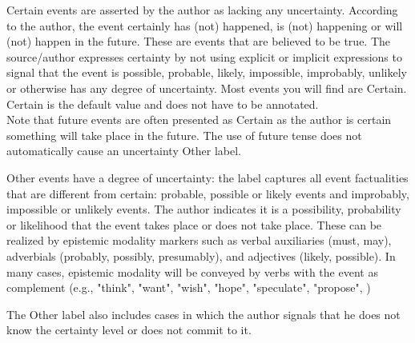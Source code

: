 \begin{description}[noitemsep,leftmargin=!,labelwidth=\widthof{\bfseries Certain}]
    \item[Certain] Certain events are asserted by the author as lacking any uncertainty.
    According to the author, the event certainly has (not) happened, is (not) happening or will (not) happen in the future.
    These are events that are believed to be true.
    The source/author expresses certainty by not using explicit or implicit expressions to signal that the event is possible, probable, likely, impossible, improbably, unlikely or otherwise has any degree of uncertainty.
    Most events you will find are Certain.
    Certain is the default value and does not have to be annotated.\\
    Note that future events are often presented as Certain as the author is certain something will take place in the future.
    The use of future tense does not automatically cause an uncertainty Other label.
    
    \item[Other] Other events have a degree of uncertainty: the label captures all event factualities that are different from certain: probable, possible or likely events and improbably, impossible or unlikely events.
    The author indicates it is a possibility, probability or likelihood that the event takes place or does not take place.
    These can be realized by epistemic modality markers such as verbal auxiliaries (must, may), adverbials (probably, possibly, presumably), and adjectives (likely, possible).
    In many cases, epistemic modality will be conveyed by verbs with the event as complement (e.g., "think", "want", "wish", "hope", "speculate", "propose", )
    
    The Other label also includes cases in which the author signals that he does not know the certainty level or does not commit to it.

\end{description}

